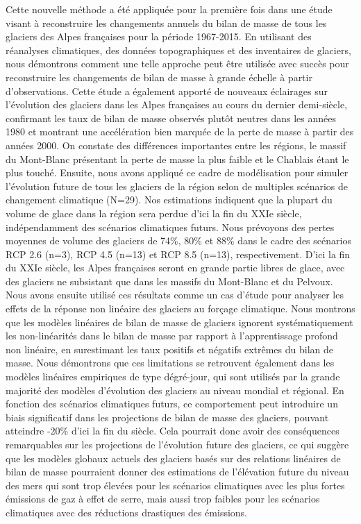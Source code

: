 Cette nouvelle méthode a été appliquée pour la première fois dans une étude visant à reconstruire les changements annuels du bilan de masse de tous les glaciers des Alpes françaises pour la période 1967-2015. En utilisant des réanalyses climatiques, des données topographiques et des inventaires de glaciers, nous démontrons comment une telle approche peut être utilisée avec succès pour reconstruire les changements de bilan de masse à grande échelle à partir d'observations. Cette étude a également apporté de nouveaux éclairages sur l'évolution des glaciers dans les Alpes françaises au cours du dernier demi-siècle, confirmant les taux de bilan de masse observés plutôt neutres dans les années 1980 et montrant une accélération bien marquée de la perte de masse à partir des années 2000. On constate des différences importantes entre les régions, le massif du Mont-Blanc présentant la perte de masse la plus faible et le Chablais étant le plus touché. Ensuite, nous avons appliqué ce cadre de modélisation pour simuler l'évolution future de tous les glaciers de la région selon de multiples scénarios de changement climatique (N=29). Nos estimations indiquent que la plupart du volume de glace dans la région sera perdue d'ici la fin du XXIe siècle, indépendamment des scénarios climatiques futurs. Nous prévoyons des pertes moyennes de volume des glaciers de 74\%, 80\% et 88\% dans le cadre des scénarios RCP 2.6 (n=3), RCP 4.5 (n=13) et RCP 8.5 (n=13), respectivement. D'ici la fin du XXIe siècle, les Alpes françaises seront en grande partie libres de glace, avec des glaciers ne subsistant que dans les massifs du Mont-Blanc et du Pelvoux. Nous avons ensuite utilisé ces résultats comme un cas d'étude pour analyser les effets de la réponse non linéaire des glaciers au forçage climatique. Nous montrons que les modèles linéaires de bilan de masse de glaciers ignorent systématiquement les non-linéarités dans le bilan de masse par rapport à l'apprentissage profond non linéaire, en surestimant les taux positifs et négatifs extrêmes du bilan de masse. Nous démontrons que ces limitations se retrouvent également dans les modèles linéaires empiriques de type dégré-jour, qui sont utilisés par la grande majorité des modèles d'évolution des glaciers au niveau mondial et régional. En fonction des scénarios climatiques futurs, ce comportement peut introduire un biais significatif dans les projections de bilan de masse des glaciers, pouvant atteindre -20\% d'ici la fin du siècle. Cela pourrait donc avoir des conséquences remarquables sur les projections de l'évolution future des glaciers, ce qui suggère que les modèles globaux actuels des glaciers basés sur des relations linéaires de bilan de masse pourraient donner des estimations de l'élévation future du niveau des mers qui sont trop élevées pour les scénarios climatiques avec les plus fortes émissions de gaz à effet de serre, mais aussi trop faibles pour les scénarios climatiques avec des réductions drastiques des émissions. 

